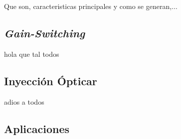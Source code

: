
Que son, caracteristicas principales y como se generan,...

	\subsection{\textit{Gain-Switching}}
		\label{Intr:OFC:GS}

		\nocite{principles}
		hola que tal todos

	\subsection{Inyección Ópticar}

		adios a todos 

	\subsection{Aplicaciones}


